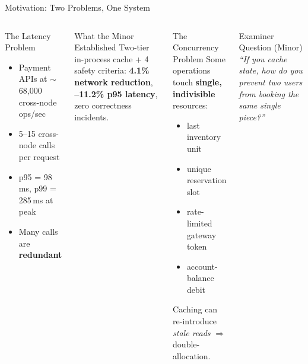 \documentclass[aspectratio=169,xcolor=dvipsnames,9pt]{beamer}
\begin{document}
\begin{frame}{Motivation: Two Problems, One System}
\begin{columns}[T]
  \begin{block}{The Latency Problem}
    \footnotesize
    \begin{itemize}
      \item Payment APIs at $\sim$68{,}000 cross-node ops/sec
      \item 5--15 cross-node calls per request
      \item p95 = 98\,ms, p99 = 285\,ms at peak
      \item Many calls are \textbf{redundant}
    \end{itemize}
  \end{block}
  \begin{exampleblock}{What the Minor Established}
    \footnotesize
    Two-tier in-process cache + 4 safety criteria:
    \textbf{4.1\% network reduction}, \textbf{--11.2\% p95 latency}, zero correctness incidents.
  \end{exampleblock}

  \begin{alertblock}{The Concurrency Problem}
    \footnotesize
    Some operations touch \textbf{single, indivisible} resources:
    \begin{itemize}
      \item last inventory unit
      \item unique reservation slot
      \item rate-limited gateway token
      \item account-balance debit
    \end{itemize}
    Caching can re-introduce \emph{stale reads} $\Rightarrow$ double-allocation.
  \end{alertblock}
  \vspace{0.4em}
  \begin{block}{Examiner Question (Minor)}
    \footnotesize\centering
    \emph{``If you cache state, how do you prevent two users from booking the same single piece?''}
  \end{block}
\end{columns}
\end{frame}
\end{document}
